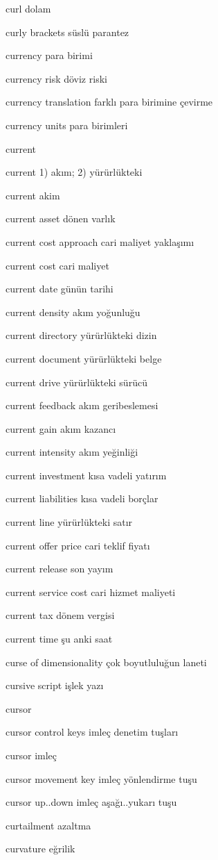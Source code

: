 \documentclass[12pt,fleqn]{article}\usepackage{../../common}
\begin{document}
curl dolam

curly brackets süslü parantez

currency para birimi

currency risk döviz riski

currency translation farklı para birimine çevirme

currency units para birimleri

current

current 1) akım; 2) yürürlükteki

current akim

current asset dönen varlık

current cost approach cari maliyet yaklaşımı

current cost cari maliyet

current date günün tarihi

current density akım yoğunluğu

current directory yürürlükteki dizin

current document yürürlükteki belge

current drive yürürlükteki sürücü

current feedback akım geribeslemesi

current gain akım kazancı

current intensity akım yeğinliği

current investment kısa vadeli yatırım

current liabilities kısa vadeli borçlar

current line yürürlükteki satır

current offer price cari teklif fiyatı

current release son yayım

current service cost cari hizmet maliyeti

current tax dönem vergisi

current time şu anki saat

curse of dimensionality çok boyutluluğun laneti

cursive script işlek yazı

cursor

cursor control keys imleç denetim tuşları

cursor imleç

cursor movement key imleç yönlendirme tuşu

cursor up..down imleç aşağı..yukarı tuşu

curtailment azaltma

curvature eğrilik
\end{document}
